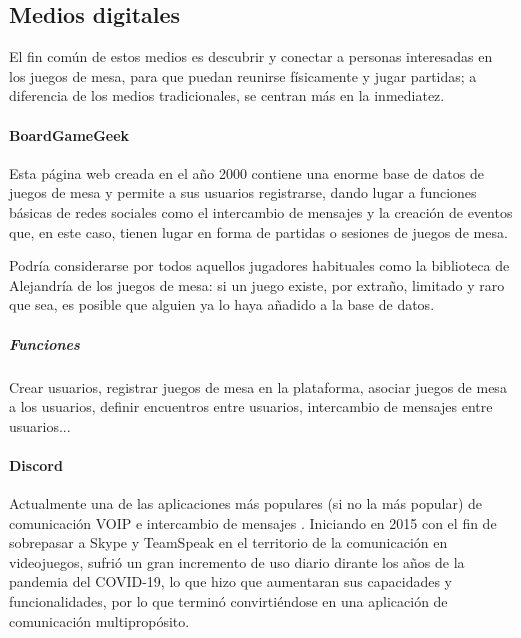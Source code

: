         \subsection{Medios digitales}

            El fin común de estos medios es descubrir y conectar a personas interesadas en los juegos de mesa, para que puedan reunirse físicamente y jugar partidas; a diferencia de los medios tradicionales, se centran más en la inmediatez.


            \paragraph{BoardGameGeek}

                Esta página web \cite{BGG} creada en el año 2000 contiene una enorme base de datos de juegos de mesa y permite a sus usuarios registrarse, dando lugar a funciones básicas de redes sociales como el intercambio de mensajes y la creación de eventos que, en este caso, tienen lugar en forma de partidas o sesiones de juegos de mesa.

                Podría considerarse por todos aquellos jugadores habituales como la biblioteca de Alejandría \cite{Biblioteca-Alejandria} de los juegos de mesa: si un juego existe, por extraño, limitado y raro que sea, es posible que alguien ya lo haya añadido a la base de datos.

                \subparagraph{Funciones}

                    Crear usuarios, registrar juegos de mesa en la plataforma, asociar juegos de mesa a los usuarios, definir encuentros entre usuarios, intercambio de mensajes entre usuarios...

            \paragraph{Discord}

                Actualmente una de las aplicaciones más populares (si no la más popular) de comunicación VOIP e intercambio de mensajes \cite{Discord}. Iniciando en 2015 con el fin de sobrepasar a Skype y TeamSpeak en el territorio de la comunicación en videojuegos, sufrió un gran incremento de uso diario dirante los años de la pandemia del COVID-19, lo que hizo que aumentaran sus capacidades y funcionalidades, por lo que terminó convirtiéndose en una aplicación de comunicación multipropósito.

